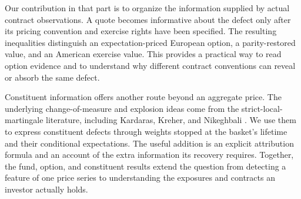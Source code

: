 Our contribution in that part is to organize the information supplied by
actual contract observations. A quote becomes informative about the defect
only after its pricing convention and exercise rights have been specified.
The resulting inequalities distinguish an expectation-priced European
option, a parity-restored value, and an American exercise value. This
provides a practical way to read option evidence and to understand why
different contract conventions can reveal or absorb the same defect.

Constituent information offers another route beyond an aggregate price.
The underlying change-of-measure and explosion ideas come from the
strict-local-martingale literature, including Kardaras, Kreher, and
Nikeghbali \cite{kardaras2015strict}. We use them to express constituent
defects through weights stopped at the basket's lifetime and their
conditional expectations. The useful addition is an explicit attribution
formula and an account of the extra information its recovery requires.
Together, the fund, option, and constituent results extend the question
from detecting a feature of one price series to understanding the
exposures and contracts an investor actually holds.
